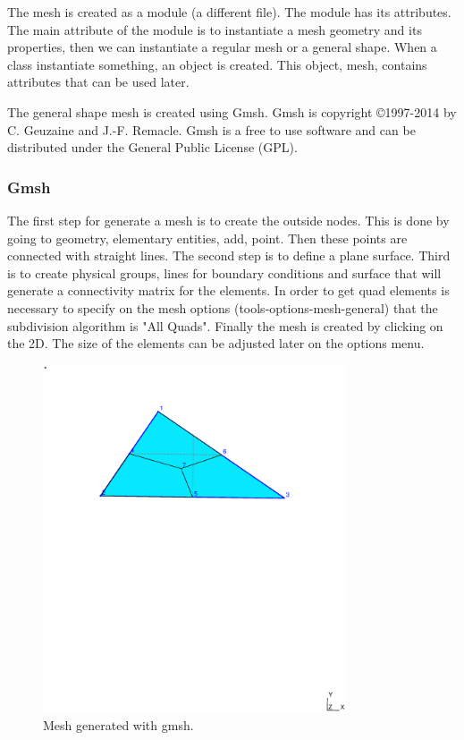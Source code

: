 \documentclass[11pt, a4paper]{article}
\numberwithin{equation}{section}
\begin{document}
The mesh is created as a module (a different file). The module has its attributes. The main attribute of the module is to instantiate a mesh geometry and its properties, then we can instantiate a regular mesh or a general shape. When a class instantiate something, an object is created. This object, mesh, contains attributes that can be used later.

The general shape mesh is created using Gmsh. Gmsh is copyright \copyright 1997-2014 by C. Geuzaine and J.-F. Remacle. Gmsh is a free to use software and can be distributed under the General Public License (GPL).

\subsubsection{Gmsh}

The first step for generate a mesh is to create the outside nodes. This is done by going to geometry, elementary entities, add, point. Then these points are connected with straight lines. The second step is to define a plane surface. Third is to create physical groups, lines for boundary conditions and surface that will generate a connectivity matrix for the elements. In order to get quad elements is necessary to specify on the mesh options (tools-options-mesh-general) that the subdivision algorithm is "All Quads". Finally the mesh is created by clicking on the 2D. The size of the elements can be adjusted later on the options menu.


\begin{figure}[H]
\centering
\includegraphics[trim = 0 550 0 100, clip,width=0.8\textwidth]{fig/meshgmsh.eps}
\caption{Mesh generated with gmsh.}
\end{figure}
\end{document}
